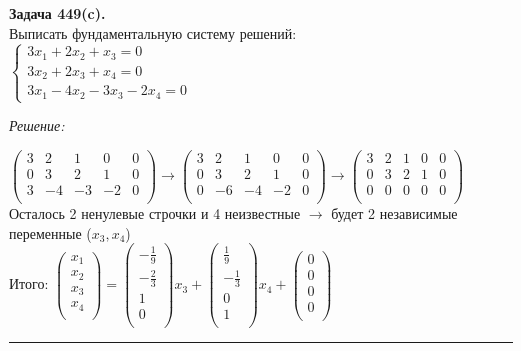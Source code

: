 \documentclass[a4paper, 12pt]{article}
\newenvironment{problem}[2][Задача]
    { \begin{mdframed}[backgroundcolor=gray!10] \textbf{#1 #2.} \\}
    {  \end{mdframed}}
\newenvironment{solution}
    {\textit{Решение: }}
    {\noindent\rule{7in}{1.5pt}}
\begin{document}
\begin{problem}{449(c)}
Выписать фундаментальную систему решений:\\
$\left\{\begin{array}{l}
3x_1+2x_2+x_3=0\\
3x_2+2x_3+x_4=0\\
3x_1-4x_2-3x_3-2x_4=0
\end{array}\right.$

\end{problem}
\begin{solution}

$
\left(
\begin{array}{rrrrrrrr}
3 &  2 &  1 &  0 & 0\\
0 &  3 &  2 &  1 & 0\\
3 & -4 & -3 & -2 & 0\\
\end{array}
\right)
\rightarrow
\left(
\begin{array}{rrrrrrrr}
3 &  2 &  1 &  0 & 0\\
0 &  3 &  2 &  1 & 0\\
0 & -6 & -4 & -2 & 0\\
\end{array}
\right)
\rightarrow
\left(
\begin{array}{rrrrrrrr}
3 & 2 & 1 & 0 & 0\\
0 & 3 & 2 & 1 & 0\\
0 & 0 & 0 & 0 & 0\\
\end{array}
\right)
$
\\
Осталось 2 ненулевые строчки и 4 неизвестные $\rightarrow$ будет 2 независимые переменные ($x_3, x_4$) \\
Итого:
$
\left(
\begin{array}{r}
x_1 \\
x_2 \\
x_3 \\
x_4 \\
\end{array}
\right)
=
\left(
\begin{array}{r}
-\frac{1}{9} \\
-\frac{2}{3} \\
1 \\
0 \\
\end{array}
\right)
x_3 +
\left(
\begin{array}{r}
\frac{1}{9} \\
-\frac{1}{3} \\
0 \\
1 \\
\end{array}
\right)
x_4 +
\left(
\begin{array}{r}
0 \\
0 \\
0 \\
0 \\
\end{array}
\right)
$

\end{solution}
\end{document}
